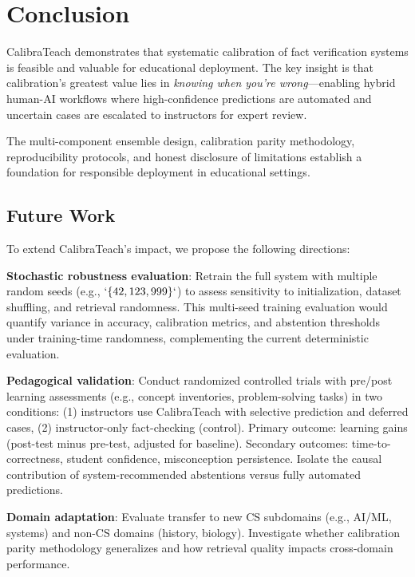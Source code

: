 \section{Conclusion}\label{conclusion}

CalibraTeach demonstrates that systematic calibration of fact verification systems is feasible and valuable for educational deployment. The key insight is that calibration's greatest value lies in \emph{knowing when you're wrong}---enabling hybrid human-AI workflows where high-confidence predictions are automated and uncertain cases are escalated to instructors for expert review.

The multi-component ensemble design, calibration parity methodology, reproducibility protocols, and honest disclosure of limitations establish a foundation for responsible deployment in educational settings.

\subsection{Future Work}\label{future-work}

To extend CalibraTeach's impact, we propose the following directions:

\textbf{Stochastic robustness evaluation}: Retrain the full system with multiple random seeds (e.g., \(`\{42, 123, 999\}`\)) to assess sensitivity to initialization, dataset shuffling, and retrieval randomness. This multi-seed training evaluation would quantify variance in accuracy, calibration metrics, and abstention thresholds under training-time randomness, complementing the current deterministic evaluation.

\textbf{Pedagogical validation}: Conduct randomized controlled trials with pre/post learning assessments (e.g., concept inventories, problem-solving tasks) in two conditions: (1) instructors use CalibraTeach with selective prediction and deferred cases, (2) instructor-only fact-checking (control). Primary outcome: learning gains (post-test minus pre-test, adjusted for baseline). Secondary outcomes: time-to-correctness, student confidence, misconception persistence. Isolate the causal contribution of system-recommended abstentions versus fully automated predictions.

\textbf{Domain adaptation}: Evaluate transfer to new CS subdomains (e.g., AI/ML, systems) and non-CS domains (history, biology). Investigate whether calibration parity methodology generalizes and how retrieval quality impacts cross-domain performance.


